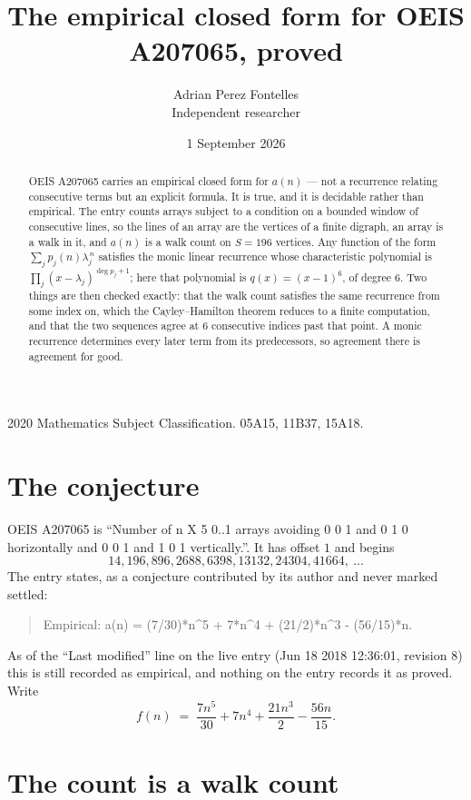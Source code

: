 \documentclass[11pt,a4paper]{article}
\title{The empirical closed form for OEIS A207065, proved}
\author{Adrian Perez Fontelles\\ \small Independent researcher}
\date{1 September 2026}
\theoremstyle{plain}
\theoremstyle{definition}
\begin{document}
\maketitle

\begin{abstract}
OEIS A207065 carries an empirical closed form for $a(n)$ --- not a recurrence relating
consecutive terms but an explicit formula. It is true, and it is decidable rather than
empirical. The entry counts arrays subject to a condition on a bounded window of consecutive lines, so the lines of an array are the
vertices of a finite digraph, an array is a walk in it, and $a(n)$ is a walk count on
$S=196$ vertices. Any function of the form $\sum_j p_j(n)\lambda_j^{\,n}$ satisfies the
monic linear recurrence whose characteristic polynomial is
$\prod_j(x-\lambda_j)^{\deg p_j+1}$; here that polynomial is $q(x)=(x-1)^{6}$, of degree
$6$. Two things are then checked exactly: that the walk count satisfies the same
recurrence from some index on, which the Cayley--Hamilton theorem reduces to a finite
computation, and that the two sequences agree at $6$ consecutive indices past that
point. A monic recurrence determines every later term from its predecessors, so agreement
there is agreement for good.
\end{abstract}

\noindent\small 2020 Mathematics Subject Classification. 05A15, 11B37, 15A18.\normalsize

\section{The conjecture}

OEIS A207065 is ``Number of n X 5 0..1 arrays avoiding 0 0 1 and 0 1 0 horizontally and 0 0 1 and 1 0 1 vertically.''. It has offset $1$ and begins
\[
14, 196, 896, 2688, 6398, 13132, 24304, 41664,\ \dots
\]
The entry states, as a conjecture contributed by its author and never marked settled:
\begin{quote}
Empirical: a(n) = (7/30)*n\^{}5 + 7*n\^{}4 + (21/2)*n\^{}3 - (56/15)*n.
\end{quote}
As of the ``Last modified'' line on the live entry (Jun 18 2018 12:36:01, revision 8) this is still
recorded as empirical, and nothing on the entry records it as proved. Write
\[
f(n)\;=\;\frac{7 n^{5}}{30} + 7 n^{4} + \frac{21 n^{3}}{2} - \frac{56 n}{15}.
\]

\section{The count is a walk count}
\end{document}

